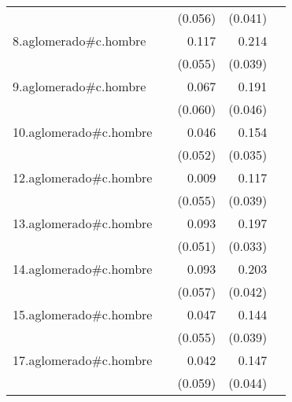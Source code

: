 {\begin{longtable}{l*{4}{D{.}{.}{-1}}}
            &                     &     (0.056)         &     (0.041)         &                     \\
\addlinespace
8.aglomerado#c.hombre&                     &       0.117\sym{*}  &       0.214\sym{***}&                     \\
            &                     &     (0.055)         &     (0.039)         &                     \\
\addlinespace
9.aglomerado#c.hombre&                     &       0.067         &       0.191\sym{***}&                     \\
            &                     &     (0.060)         &     (0.046)         &                     \\
\addlinespace
10.aglomerado#c.hombre&                     &       0.046         &       0.154\sym{***}&                     \\
            &                     &     (0.052)         &     (0.035)         &                     \\
\addlinespace
12.aglomerado#c.hombre&                     &       0.009         &       0.117\sym{**} &                     \\
            &                     &     (0.055)         &     (0.039)         &                     \\
\addlinespace
13.aglomerado#c.hombre&                     &       0.093         &       0.197\sym{***}&                     \\
            &                     &     (0.051)         &     (0.033)         &                     \\
\addlinespace
14.aglomerado#c.hombre&                     &       0.093         &       0.203\sym{***}&                     \\
            &                     &     (0.057)         &     (0.042)         &                     \\
\addlinespace
15.aglomerado#c.hombre&                     &       0.047         &       0.144\sym{***}&                     \\
            &                     &     (0.055)         &     (0.039)         &                     \\
\addlinespace
17.aglomerado#c.hombre&                     &       0.042         &       0.147\sym{***}&                     \\
            &                     &     (0.059)         &     (0.044)         &                     \\

\end{longtable}}
